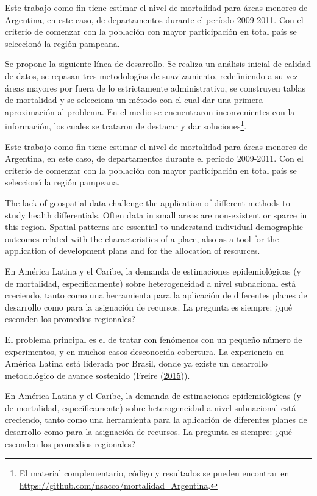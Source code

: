 \documentclass[12pt,]{article}
\begin{document}
Este trabajo como fin tiene estimar el nivel de mortalidad para áreas
menores de Argentina, en este caso, de departamentos durante el período
2009-2011. Con el criterio de comenzar con la población con mayor
participación en total país se seleccionó la región pampeana.

Se propone la siguiente línea de desarrollo. Se realiza un análisis
inicial de calidad de datos, se repasan tres metodologías de
suavizamiento, redefiniendo a su vez áreas mayores por fuera de lo
estrictamente administrativo, se construyen tablas de mortalidad y se
selecciona un método con el cual dar una primera aproximación al
problema. En el medio se encuentraron inconvenientes con la información,
los cuales se trataron de destacar y dar soluciones\footnote{El material
  complementario, código y resultados se pueden encontrar en
  \url{https://github.com/nsacco/mortalidad_Argentina}.}.

Este trabajo como fin tiene estimar el nivel de mortalidad para áreas
menores de Argentina, en este caso, de departamentos durante el período
2009-2011. Con el criterio de comenzar con la población con mayor
participación en total país se seleccionó la región pampeana.

The lack of geospatial data challenge the application of different
methods to study health differentials. Often data in small areas are
non-existent or sparce in this region. Spatial patterns are essential to
understand individual demographic outcomes related with the
characteristics of a place, also as a tool for the application of
development plans and for the allocation of resources.

En América Latina y el Caribe, la demanda de estimaciones
epidemiológicas (y de mortalidad, específicamente) sobre heterogeneidad
a nivel subnacional está creciendo, tanto como una herramienta para la
aplicación de diferentes planes de desarrollo como para la asignación de
recursos. La pregunta es siempre: ¿qué esconden los promedios
regionales?

El problema principal es el de tratar con fenómenos con un pequeño
número de experimentos, y en muchos casos desconocida cobertura. La
experiencia en América Latina está liderada por Brasil, donde ya existe
un desarrollo metodológico de avance sostenido (Freire
(\protect\hyperlink{ref-FreireEtAl2015}{2015})).

En América Latina y el Caribe, la demanda de estimaciones
epidemiológicas (y de mortalidad, específicamente) sobre heterogeneidad
a nivel subnacional está creciendo, tanto como una herramienta para la
aplicación de diferentes planes de desarrollo como para la asignación de
recursos. La pregunta es siempre: ¿qué esconden los promedios
regionales?
\end{document}
